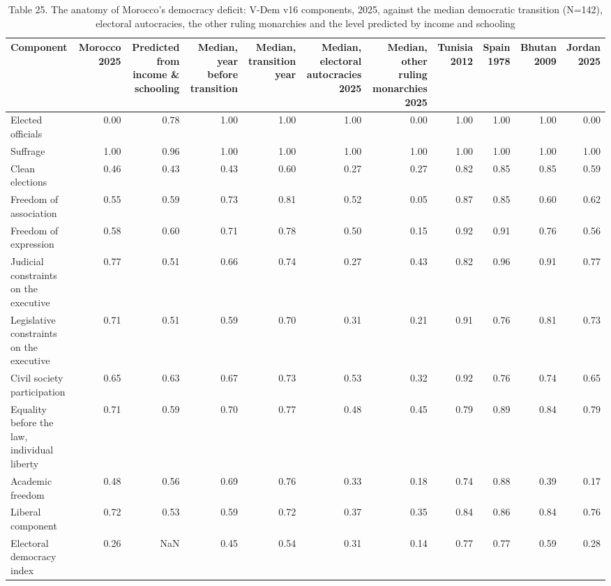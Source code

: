 \begin{table}
\caption{Table 25. The anatomy of Morocco's democracy deficit: V-Dem v16 components, 2025, against the median democratic transition (N=142), electoral autocracies, the other ruling monarchies and the level predicted by income and schooling}
\label{tab:T25_components}
\begin{tabular}{lrrrrrrrrrr}
\toprule
Component & Morocco 2025 & Predicted from income \& schooling & Median, year before transition & Median, transition year & Median, electoral autocracies 2025 & Median, other ruling monarchies 2025 & Tunisia 2012 & Spain 1978 & Bhutan 2009 & Jordan 2025 \\
\midrule
Elected officials & 0.00 & 0.78 & 1.00 & 1.00 & 1.00 & 0.00 & 1.00 & 1.00 & 1.00 & 0.00 \\
Suffrage & 1.00 & 0.96 & 1.00 & 1.00 & 1.00 & 1.00 & 1.00 & 1.00 & 1.00 & 1.00 \\
Clean elections & 0.46 & 0.43 & 0.43 & 0.60 & 0.27 & 0.27 & 0.82 & 0.85 & 0.85 & 0.59 \\
Freedom of association & 0.55 & 0.59 & 0.73 & 0.81 & 0.52 & 0.05 & 0.87 & 0.85 & 0.60 & 0.62 \\
Freedom of expression & 0.58 & 0.60 & 0.71 & 0.78 & 0.50 & 0.15 & 0.92 & 0.91 & 0.76 & 0.56 \\
Judicial constraints on the executive & 0.77 & 0.51 & 0.66 & 0.74 & 0.27 & 0.43 & 0.82 & 0.96 & 0.91 & 0.77 \\
Legislative constraints on the executive & 0.71 & 0.51 & 0.59 & 0.70 & 0.31 & 0.21 & 0.91 & 0.76 & 0.81 & 0.73 \\
Civil society participation & 0.65 & 0.63 & 0.67 & 0.73 & 0.53 & 0.32 & 0.92 & 0.76 & 0.74 & 0.65 \\
Equality before the law, individual liberty & 0.71 & 0.59 & 0.70 & 0.77 & 0.48 & 0.45 & 0.79 & 0.89 & 0.84 & 0.79 \\
Academic freedom & 0.48 & 0.56 & 0.69 & 0.76 & 0.33 & 0.18 & 0.74 & 0.88 & 0.39 & 0.17 \\
Liberal component & 0.72 & 0.53 & 0.59 & 0.72 & 0.37 & 0.35 & 0.84 & 0.86 & 0.84 & 0.76 \\
Electoral democracy index & 0.26 & NaN & 0.45 & 0.54 & 0.31 & 0.14 & 0.77 & 0.77 & 0.59 & 0.28 \\
\bottomrule
\end{tabular}
\end{table}
